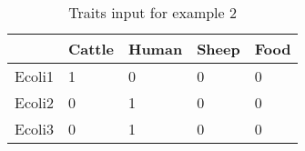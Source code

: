 \begin{longtable}{| X | X | X | X | X |}
  \caption{Traits input for example 2}\label{tab:hostgroups} \\
  \toprule
  & Cattle & Human & Sheep & Food \\
  \midrule
  Ecoli1 & 1 & 0 & 0 & 0 \\
  Ecoli2 & 0 & 1 & 0 & 0 \\
  Ecoli3 & 0 & 1 & 0 & 0 \\
  \bottomrule
\end{longtable}